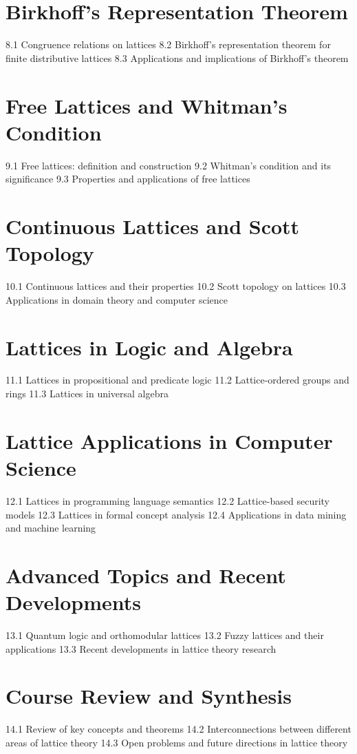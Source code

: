 \section{Birkhoff's Representation Theorem}
8.1 Congruence relations on lattices
8.2 Birkhoff's representation theorem for finite distributive lattices
8.3 Applications and implications of Birkhoff's theorem
\section{Free Lattices and Whitman's Condition}
9.1 Free lattices: definition and construction
9.2 Whitman's condition and its significance
9.3 Properties and applications of free lattices
\section{Continuous Lattices and Scott Topology}
10.1 Continuous lattices and their properties
10.2 Scott topology on lattices
10.3 Applications in domain theory and computer science
\section{Lattices in Logic and Algebra}
11.1 Lattices in propositional and predicate logic
11.2 Lattice-ordered groups and rings
11.3 Lattices in universal algebra
\section{Lattice Applications in Computer Science}
12.1 Lattices in programming language semantics
12.2 Lattice-based security models
12.3 Lattices in formal concept analysis
12.4 Applications in data mining and machine learning
\section{Advanced Topics and Recent Developments}
13.1 Quantum logic and orthomodular lattices
13.2 Fuzzy lattices and their applications
13.3 Recent developments in lattice theory research
\section{Course Review and Synthesis}
14.1 Review of key concepts and theorems
14.2 Interconnections between different areas of lattice theory
14.3 Open problems and future directions in lattice theory
